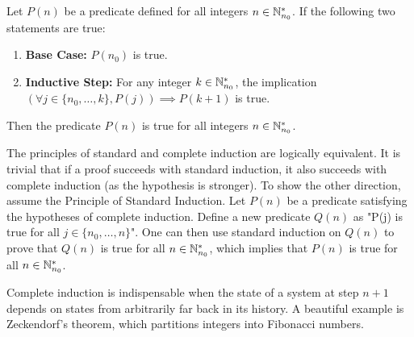 \begin{theorem}\label{thm:complete_induction}
Let $P(n)$ be a predicate defined for all integers $n \in \mathbb{N}_{n_0}^*$. If the following two statements are true:
\begin{enumerate}
    \item \textbf{Base Case:} $P(n_0)$ is true.
    \item \textbf{Inductive Step:} For any integer $k \in \mathbb{N}_{n_0}^*$, the implication $(\forall j \in \{n_0, \dots, k\}, P(j)) \implies P(k+1)$ is true.
\end{enumerate}
Then the predicate $P(n)$ is true for all integers $n \in \mathbb{N}_{n_0}^*$.
\end{theorem}
\begin{remark}
The principles of standard and complete induction are logically equivalent. It is trivial that if a proof succeeds with standard induction, it also succeeds with complete induction (as the hypothesis is stronger). To show the other direction, assume the Principle of Standard Induction. Let $P(n)$ be a predicate satisfying the hypotheses of complete induction. Define a new predicate $Q(n)$ as "P(j) is true for all $j \in \{n_0, \dots, n\}$". One can then use standard induction on $Q(n)$ to prove that $Q(n)$ is true for all $n \in \mathbb{N}_{n_0}^*$, which implies that $P(n)$ is true for all $n \in \mathbb{N}_{n_0}^*$.
\end{remark}

Complete induction is indispensable when the state of a system at step $n+1$ depends on states from arbitrarily far back in its history. A beautiful example is Zeckendorf's theorem, which partitions integers into Fibonacci numbers.

